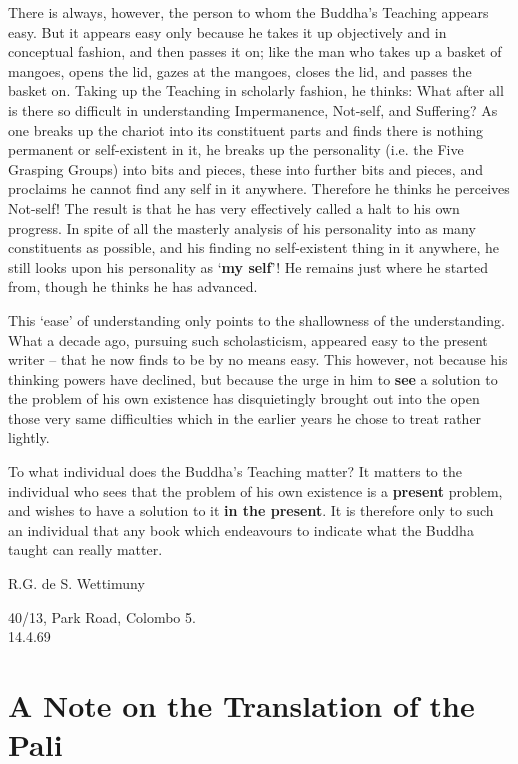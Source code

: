 There is always, however, the person to whom the Buddha's Teaching appears easy. But it appears easy only because he takes it up objectively and in conceptual fashion, and then passes it on; like the man who takes up a basket of mangoes, opens the lid, gazes at the mangoes, closes the lid, and passes the basket on. Taking up the Teaching in scholarly fashion, he thinks: What after all is there so difficult in understanding Impermanence, Not-self, and Suffering? As one breaks up the chariot into its constituent parts and finds there is nothing permanent or self-existent in it, he breaks up the personality (i.e. the Five Grasping Groups) into bits and pieces, these into further bits and pieces, and proclaims he cannot find any self in it anywhere. Therefore he thinks he perceives Not-self! The result is that he has very effectively called a halt to his own progress. In spite of all the masterly analysis of his personality into as many constituents as possible, and his finding no self-existent thing in it anywhere, he still looks upon his personality as `\textbf{my self}'! He remains just where he started from, though he thinks he has advanced.

This `ease' of understanding only points to the shallowness of the understanding. What a decade ago, pursuing such scholasticism, appeared easy to the present writer -- that he now finds to be by no means easy. This however, not because his thinking powers have declined, but because the urge in him to \textbf{see} a solution to the problem of his own existence has disquietingly brought out into the open those very same difficulties which in the earlier years he chose to treat rather lightly.

To what individual does the Buddha's Teaching matter? It matters to the individual who sees that the problem of his own existence is a \textbf{present} problem, and wishes to have a solution to it \textbf{in the present}. It is therefore only to such an individual that any book which endeavours to indicate what the Buddha taught can really matter.

R.G. de S. Wettimuny

40/13, Park Road, Colombo 5.\\
14.4.69

\hypertarget{_a_note_on_the_translation_of_the_pali}{%
\section{A Note on the Translation of the Pali}\label{_a_note_on_the_translation_of_the_pali}}

